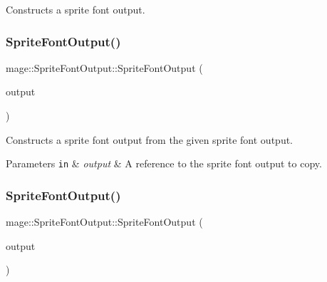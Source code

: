 Constructs a sprite font output. \hypertarget{structmage_1_1_sprite_font_output_a02ea4f9574bce22b4f0f32b78b6b3b79}{}\label{structmage_1_1_sprite_font_output_a02ea4f9574bce22b4f0f32b78b6b3b79} 
\subsubsection{\texorpdfstring{Sprite\+Font\+Output()}{SpriteFontOutput()}\hspace{0.1cm}{\footnotesize\ttfamily [2/3]}}
{\footnotesize\ttfamily mage\+::\+Sprite\+Font\+Output\+::\+Sprite\+Font\+Output (\begin{DoxyParamCaption}\item[{const \hyperlink{structmage_1_1_sprite_font_output}{Sprite\+Font\+Output} \&}]{output }\end{DoxyParamCaption})\hspace{0.3cm}{\ttfamily [delete]}}

Constructs a sprite font output from the given sprite font output.


\begin{DoxyParams}[1]{Parameters}
\mbox{\tt in}  & {\em output} & A reference to the sprite font output to copy. \\
\hline
\end{DoxyParams}
\hypertarget{structmage_1_1_sprite_font_output_ac7dbae468f4e14c2a41860c1ca4a05f6}{}\label{structmage_1_1_sprite_font_output_ac7dbae468f4e14c2a41860c1ca4a05f6} 
\subsubsection{\texorpdfstring{Sprite\+Font\+Output()}{SpriteFontOutput()}\hspace{0.1cm}{\footnotesize\ttfamily [3/3]}}
{\footnotesize\ttfamily mage\+::\+Sprite\+Font\+Output\+::\+Sprite\+Font\+Output (\begin{DoxyParamCaption}\item[{\hyperlink{structmage_1_1_sprite_font_output}{Sprite\+Font\+Output} \&\&}]{output }\end{DoxyParamCaption})\hspace{0.3cm}{\ttfamily [default]}}

